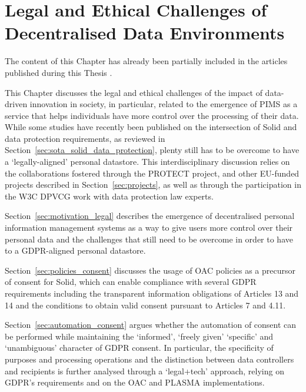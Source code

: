 \chapter{Legal and Ethical Challenges of Decentralised Data Environments}
\label{chap:legal}

\begin{tcolorbox}[colback=royallavender!40]
The content of this Chapter has already been partially included in the articles published during this Thesis \citep{esteves_fostering_2022,asgarinia_who_2023,florea_is_2023}.
\end{tcolorbox}

This Chapter discusses the legal and ethical challenges of the impact of data-driven innovation in society, in particular, related to the emergence of PIMS as a service that helps individuals have more control over the processing of their data.
While some studies have recently been published on the intersection of Solid and data protection requirements, as reviewed in Section~\ref{sec:sota_solid_data_protection}, plenty still has to be overcome to have a `legally-aligned' personal datastore.
This interdisciplinary discussion relies on the collaborations fostered through the PROTECT project, and other EU-funded projects described in Section~\ref{sec:projects}, as well as through the participation in the W3C DPVCG work with data protection law experts.

Section~\ref{sec:motivation_legal} describes the emergence of decentralised personal information management systems as a way to give users more control over their personal data and the challenges that still need to be overcome in order to have to a GDPR-aligned personal datastore.

Section~\ref{sec:policies_consent} discusses the usage of OAC policies as a precursor of consent for Solid, which can enable compliance with several GDPR requirements including the transparent information obligations of Articles 13 and 14 and the conditions to obtain valid consent pursuant to Articles 7 and 4.11.

Section~\ref{sec:automation_consent} argues whether the automation of consent can be performed while maintaining the `informed', `freely given' `specific' and `unambiguous' character of GDPR consent.
In particular, the specificity of purposes and processing operations and the distinction between data controllers and recipients is further analysed through a `legal+tech' approach, relying on GDPR's requirements and on the OAC and PLASMA implementations. 




% 
% 